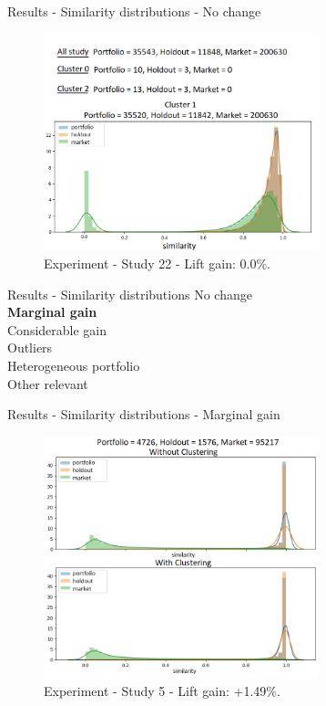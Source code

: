\begin{frame}{Results - Similarity distributions - No change}
    \begin{figure}
       \centering
       \includegraphics[width=8cm]{fig/ch4-study-22-clusters-simi-plot.png}
       \caption{Experiment \nameExperimentI{} - Study 22 - Lift gain: \colorbox{white}{0.0\%.}}
    \end{figure}
\end{frame}


\begin{frame}{Results - Similarity distributions}
    No change \\ 
    \vspace{0.5cm}
    \textbf{Marginal gain} \\
    \vspace{0.5cm}
    Considerable gain \\
    \vspace{0.5cm}
    Outliers \\
    \vspace{0.5cm}
    Heterogeneous portfolio \\
    \vspace{0.5cm}
    Other relevant 
\end{frame}


\begin{frame}{Results - Similarity distributions - Marginal gain}
    \begin{figure}
        \centering
        \includegraphics[width=8cm]{fig/ch4-study-5-marginal-increase-exp-2.png}
        \caption{Experiment \nameExperimentII{} - Study 5 - Lift gain: \colorbox{lgreen}{+1.49\%.}}
    \end{figure}
\end{frame}

